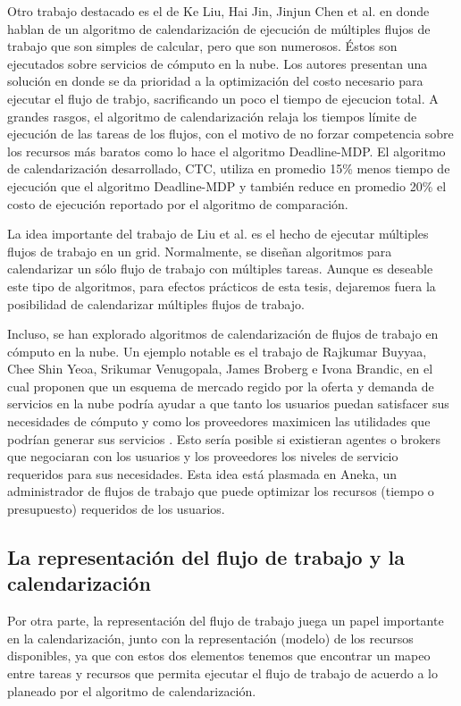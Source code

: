 \documentclass[letterpaper]{report}
\begin{document}
Otro trabajo destacado es el de Ke Liu, Hai Jin, Jinjun Chen et al. \cite{liu2010compromised} en donde hablan de un algoritmo de calendarización de ejecución de múltiples flujos de trabajo que son simples de calcular, pero que son numerosos. Éstos son ejecutados sobre servicios de cómputo en la nube. Los autores presentan una solución en donde se da prioridad a la optimización del costo necesario para ejecutar el flujo de trabjo, sacrificando un poco el tiempo de ejecucion total. A grandes rasgos, el algoritmo de calendarización relaja los tiempos límite de ejecución de las tareas de los flujos, con el motivo de no forzar competencia sobre los recursos más baratos como lo hace el algoritmo Deadline-MDP. El algoritmo de calendarización desarrollado, CTC, utiliza en promedio 15\% menos tiempo de ejecución que el algoritmo Deadline-MDP y también reduce en promedio 20\% el costo de ejecución reportado por el algoritmo de comparación.

La idea importante del trabajo de Liu et al. es el hecho de ejecutar múltiples flujos de trabajo en un grid. Normalmente, se diseñan algoritmos para calendarizar un sólo flujo de trabajo con múltiples tareas. Aunque es deseable este tipo de algoritmos, para efectos prácticos de esta tesis, dejaremos fuera la posibilidad de calendarizar múltiples flujos de trabajo.

Incluso, se han explorado algoritmos de calendarización de flujos de trabajo en cómputo en la nube. Un ejemplo notable es el trabajo de Rajkumar Buyyaa, Chee Shin Yeoa, Srikumar Venugopala, James Broberg e Ivona Brandic, en el cual proponen que un esquema de mercado regido por la oferta y demanda de servicios en la nube podría ayudar a que tanto los usuarios puedan satisfacer sus necesidades de cómputo y como los proveedores maximicen las utilidades que podrían generar sus servicios \cite{buyya2009cloud}. Esto sería posible si existieran agentes o brokers que negociaran con los usuarios y los proveedores los niveles de servicio requeridos para sus necesidades. Esta idea está plasmada en Aneka, un administrador de flujos de trabajo que puede optimizar los recursos (tiempo o presupuesto) requeridos de los usuarios.

\subsection*{La representación del flujo de trabajo y la calendarización}

Por otra parte, la representación del flujo de trabajo juega un papel importante en la calendarización, junto con la representación (modelo) de los recursos disponibles, ya que con estos dos elementos tenemos que encontrar un mapeo entre tareas y recursos que permita ejecutar el flujo de trabajo de acuerdo a lo planeado por el algoritmo de calendarización.
\end{document}
